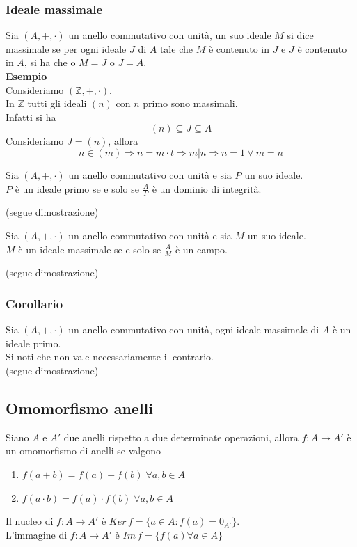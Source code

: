 \begin{flushleft}
\subsubsection{Ideale massimale}
Sia $(A, +, \cdot)$ un anello commutativo con unità, un suo ideale $M$ si dice massimale se per ogni ideale $J$ di $A$ tale che $M$ è contenuto in $J$ e $J$ è contenuto in $A$, si ha che o $M=J$ o $J=A$.\\
\textbf{Esempio}\\
Consideriamo $(\mathbb{Z}, +, \cdot)$.\\
In $\mathbb{Z}$ tutti gli ideali $(n)$ con $n$ primo sono massimali.\\
Infatti si ha
\[(n) \subseteq J \subseteq A\]
Consideriamo $J = (n)$, allora
\[n\in (m) \Rightarrow n = m\cdot t \Rightarrow m|n \Rightarrow n = 1 \vee m = n \]
\begin{proprieta}
Sia $(A, +, \cdot)$ un anello commutativo con unità e sia $P$ un suo ideale.\\
$P$ è un ideale primo se e solo se $\frac{A}{P}$ è un dominio di integrità.
\end{proprieta}
(segue dimostrazione)
\\ \vspace{300px}
\begin{proprieta}
Sia $(A, +, \cdot)$ un anello commutativo con unità e sia $M$ un suo ideale.\\
$M$ è un ideale massimale se e solo se $\frac{A}{M}$ è un campo.
\end{proprieta}
(segue dimostrazione)
\\ \vspace{300px}



\subsubsection{Corollario}
Sia $(A, +, \cdot)$ un anello commutativo con unità, ogni ideale massimale di $A$ è un ideale primo.\\
Si noti che non vale necessariamente il contrario.\\
(segue dimostrazione)
\\ \vspace{300px}


\subsection{Omomorfismo anelli}
Siano $A$ e $A'$ due anelli rispetto a due determinate operazioni, allora $f:A\to A'$ è un omomorfismo di anelli se valgono
\begin{enumerate}
    \item $f(a+b) = f(a) + f(b)\; \forall a,b \in A$
    \item $f(a\cdot b) = f(a) \cdot f(b)\; \forall a,b \in A$
\end{enumerate}
Il nucleo di $f:A\to A'$ è $Ker\,f = \{a\in A: f(a) =0_{A'}\}$.\\
L'immagine di $f:A\to A'$ è $Im\,f = \{f(a) \forall a \in A\}$


\end{flushleft}
